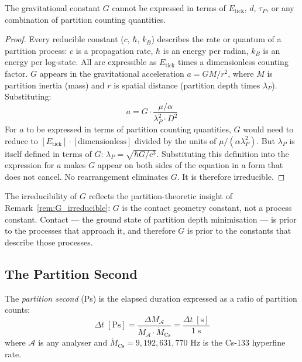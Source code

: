 \begin{theorem}[G is Irreducible]
\label{thm:G_irreducible}
The gravitational constant $G$ cannot be expressed in terms of $E_{\mathrm{tick}}$,
$d$, $\tau_P$, or any combination of partition counting quantities.
\end{theorem}

\begin{proof}
Every reducible constant ($c$, $\hbar$, $k_B$) describes the rate or quantum of
a partition process: $c$ is a propagation rate, $\hbar$ is an energy per radian,
$k_B$ is an energy per log-state. All are expressible as $E_{\mathrm{tick}}$
times a dimensionless counting factor. $G$ appears in the gravitational
acceleration $a = GM/r^2$, where $M$ is partition inertia (mass) and $r$ is
spatial distance (partition depth times $\lambda_P$). Substituting:
\begin{equation}
    a = G \cdot \frac{\mu/\alpha}{\lambda_P^2 \cdot D^2}
\end{equation}
For $a$ to be expressed in terms of partition counting quantities, $G$ would
need to reduce to $[E_{\mathrm{tick}}] \cdot [\mathrm{dimensionless}]$ divided
by the units of $\mu/(\alpha \lambda_P^2)$. But $\lambda_P$ is itself defined in
terms of $G$: $\lambda_P = \sqrt{\hbar G/c^3}$. Substituting this definition
into the expression for $a$ makes $G$ appear on both sides of the equation in a
form that does not cancel. No rearrangement eliminates $G$. It is therefore
irreducible.
\end{proof}

The irreducibility of $G$ reflects the partition-theoretic insight of
Remark~\ref{rem:G_irreducible}: $G$ is the contact geometry constant, not a
process constant. Contact --- the ground state of partition depth minimisation
--- is prior to the processes that approach it, and therefore $G$ is prior to
the constants that describe those processes.

\subsection{The Partition Second}
\label{subsec:partition_second}

\begin{definition}
\label{def:partition_second}
The \emph{partition second} (Ps) is the elapsed duration expressed as a ratio
of partition counts:
\begin{equation}
    \Delta t \;[\mathrm{Ps}] = \frac{\Delta M_{\mathcal{A}}}{\dot{M}_{\mathcal{A}}
    \cdot \dot{M}_{\mathrm{Cs}}} = \frac{\Delta t \;[\mathrm{s}]}{1\;\mathrm{s}}
    \label{eq:partition_second}
\end{equation}
where $\mathcal{A}$ is any analyser and $\dot{M}_{\mathrm{Cs}} = 9{,}192{,}631{,}770$
Hz is the Cs-133 hyperfine rate.
\end{definition}

